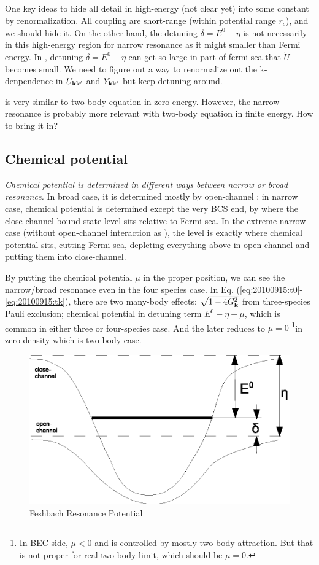 \subsection{}
One key ideas to hide all detail in high-energy (not clear yet) into some constant by renormalization.  All coupling are short-range (within potential range $r_{c}$), and we should hide it.  On the other hand, the detuning $\delta=E^{0}-\eta$ is not necessarily in this high-energy region for narrow resonance as it might smaller than Fermi energy.  In , detuning $\delta=E^{0}-\eta$ can get so large in part of fermi sea that $\tilde{U}$ becomes small.  We need to figure out a way to renormalize out the k-denpendence in $U_{\mathbf{k}\mathbf{k}'}$ and $Y_{\mathbf{k}\mathbf{k}'}$ but keep detuning around.  

 is very similar to two-body \sch equation in zero energy.  However, the narrow resonance is probably more relevant with two-body \sch equation in finite energy.  How to bring it in?

\subsection{Chemical potential}
\emph{Chemical potential is determined in different ways between narrow or broad resonance.  }In broad case, it is determined mostly by open-channel ; in narrow case, chemical potential is determined  except the very BCS end,  by where the close-channel bound-state level sits relative to Fermi sea.  In the extreme narrow case (without open-channel interaction as \cite{GurarieNarrow}), the level is exactly where chemical potential sits, cutting Fermi sea, depleting everything above in open-channel and putting them into close-channel.   

By  putting the chemical potential $\mu$ in the proper position, we can see the narrow/broad resonance even in the four species case.  In Eq. (\ref{eq:20100915:t0}-\ref{eq:20100915:tk}), there are two many-body effects: $\sqrt{1-4G_{\mathbf{k}}^{2}}$ from three-species Pauli exclusion; chemical potential in detuning term $E^{0}-\eta+\mu$, which is common in either three or four-species case.  And the later reduces to $\mu=0$ \footnote{In BEC side, $\mu<0$ and is controlled by mostly two-body attraction.  But that is not proper for real two-body limit, which should be $\mu=0$.}in zero-density which is two-body case. 
\begin{figure}[hhtb]
	\centering
		\includegraphics[width=.50\textwidth]{image/FeshbachPotential}
	\caption{Feshbach Resonance Potential\label{fig:FeshbachPotential}}	
\end{figure}


